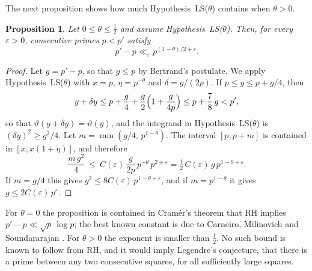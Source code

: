 \documentclass[11pt,reqno]{amsart}
\newtheorem{proposition}[theorem]{Proposition}
\theoremstyle{definition}
\theoremstyle{remark}
\numberwithin{equation}{section}
\newcommand{\eps}{\varepsilon}
\begin{document}
The next proposition shows how much Hypothesis~LS($\theta$) contains when $\theta>0$.

\begin{proposition}\label{prop:gaps}
Let $0\le\theta\le\frac12$ and assume Hypothesis~LS($\theta$). Then, for every $\eps>0$, consecutive primes $p<p'$ satisfy
\[
 p'-p\ll_\eps p^{(1-\theta)/2+\eps}.
\]
\end{proposition}

\begin{proof}
Let $g=p'-p$, so that $g\le p$ by Bertrand's postulate. We apply Hypothesis~LS($\theta$) with $x=p$, $\eta=p^{-\theta}$ and $\delta=g/(2p)$. If $p\le y\le p+g/4$, then
\[
 y+\delta y\le p+\frac g4+\frac g2\Bigl(1+\frac g{4p}\Bigr)\le p+\frac78\,g<p',
\]
so that $\vartheta(y+\delta y)=\vartheta(y)$, and the integrand in Hypothesis~LS($\theta$) is $(\delta y)^2\ge g^2/4$. Let $m=\min(g/4,\,p^{1-\theta})$. The interval $[p,p+m]$ is contained in $[x,x(1+\eta)]$, and therefore
\[
 \frac{m\,g^2}{4}\ \le\ C(\eps)\,\frac{g}{2p}\,p^{-\theta}\,p^{2+\eps}=\tfrac12\,C(\eps)\,g\,p^{1-\theta+\eps}.
\]
If $m=g/4$ this gives $g^2\le8C(\eps)\,p^{1-\theta+\eps}$, and if $m=p^{1-\theta}$ it gives $g\le2C(\eps)\,p^{\eps}$.
\end{proof}

For $\theta=0$ the proposition is contained in Cram\'er's theorem \cite{Cr} that RH implies $p'-p\ll\sqrt p\,\log p$; the best known constant is due to Carneiro, Milinovich and Soundararajan \cite{CMS}. For $\theta>0$ the exponent is smaller than $\frac12$. No such bound is known to follow from RH, and it would imply Legendre's conjecture, that there is a prime between any two consecutive squares, for all sufficiently large squares.
\end{document}
